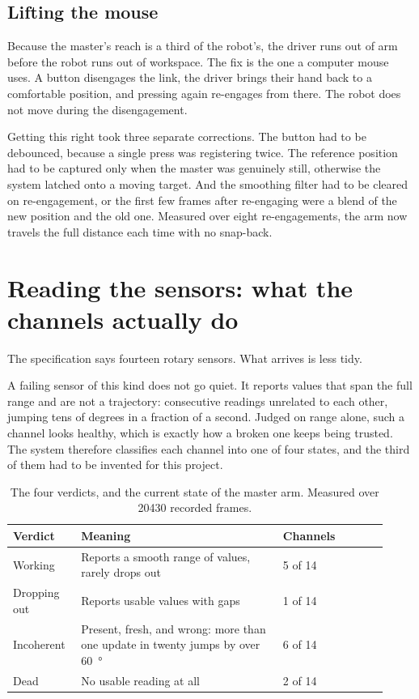 \subsection{Lifting the mouse}

Because the master's reach is a third of the robot's, the driver runs out of
arm before the robot runs out of workspace. The fix is the one a computer
mouse uses. A button disengages the link, the driver brings their hand back to
a comfortable position, and pressing again re-engages from there. The robot
does not move during the disengagement.

Getting this right took three separate corrections. The button had to be
debounced, because a single press was registering twice. The reference
position had to be captured only when the master was genuinely still,
otherwise the system latched onto a moving target. And the smoothing filter
had to be cleared on re-engagement, or the first few frames after re-engaging
were a blend of the new position and the old one. Measured over eight
re-engagements, the arm now travels the full distance each time with no
snap-back.

\section{Reading the sensors: what the channels actually do}

The specification says fourteen rotary sensors. What arrives is less tidy.

A failing sensor of this kind does not go quiet. It reports values that span
the full range and are not a trajectory: consecutive readings unrelated to
each other, jumping tens of degrees in a fraction of a second. Judged on range
alone, such a channel looks healthy, which is exactly how a broken one keeps
being trusted. The system therefore classifies each channel into one of four
states, and the third of them had to be invented for this project.

\begin{table}[htbp]
  \centering
  \small
  \caption[Channel verdicts]{The four verdicts, and the current state of the
  master arm. Measured over \num{20430} recorded frames.}
  \label{tab:verdicts}
  \begin{tabular}{@{}p{0.16\linewidth}p{0.50\linewidth}p{0.26\linewidth}@{}}
    \toprule
    \textbf{Verdict} & \textbf{Meaning} & \textbf{Channels} \\
    \midrule
    Working & Reports a smooth range of values, rarely drops out & 5 of 14 \\
    Dropping out & Reports usable values with gaps & 1 of 14 \\
    Incoherent & Present, fresh, and wrong: more than one update in twenty
      jumps by over \SI{60}{\degree} & 6 of 14 \\
    Dead & No usable reading at all & 2 of 14 \\
    \bottomrule
  \end{tabular}
\end{table}

